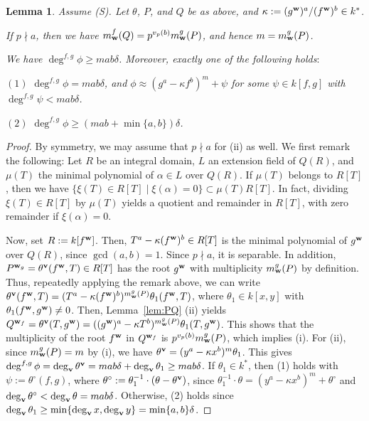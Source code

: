\documentclass{amsart}
\theoremstyle{plain}
\newtheorem{lem}[thm]{Lemma}
\theoremstyle{definition}
\newcommand{\nd}{\noindent}
\newcommand{\w}{{\bf w}}
\newcommand{\bv}{{\bf v}}
\newcommand{\degw  }{\deg}
\begin{document}
\begin{lem}\label{lem:lcm}
Assume {\rm (S)}. 
Let $\theta $, $P$, and $Q$ be as above, 
and $\kappa :=(g^{\w })^a/(f^{\w })^b\in k^*$. 


\nd{\rm (i)} 
If $p\nmid a$, then 
we have $m_{\w }^f(Q)=p^{v_p(b)}m_{\w }^g(P)$, 
and hence $m=m_{\w }^g(P)$. 


\nd{\rm (ii)} 
We have 
$\deg ^{f,g}\phi \ge mab\delta $. 
Moreover, 
exactly one of the following holds$:$ 



\nd 
$(1)$ 
$\deg ^{f,g}\phi =mab\delta $, 
and 
$\phi \approx (g^a-\kappa f^b)^m+\psi $ 
for some $\psi \in k[f,g]$ with $\deg ^{f,g}\psi <mab\delta $. 


\nd 
$(2)$ 
$\degw ^{f,g}\phi \ge (mab+\min \{ a,b\} )\delta $. 



\end{lem}
\begin{proof}
By symmetry, 
we may assume that $p\nmid a$ for (ii) as well. 
We first remark the following: 
Let $R$ be an integral domain, 
$L$ an extension field of $Q(R)$, 
and $\mu (T)$ the minimal polynomial of $\alpha \in L$ over $Q(R)$. 
If $\mu (T)$ belongs to $R[T]$, 
then we have 
$\{ \xi (T)\in R[T]\mid \xi (\alpha )=0\} \subset \mu (T)R[T]$. 
In fact, 
dividing $\xi (T)\in R[T]$ by $\mu (T)$ 
yields a quotient and remainder in $R[T]$, 
with zero remainder if $\xi (\alpha )=0$. 


Now, 
set $R:=k[f^{\w }]$. 
Then, $T^a-\kappa (f^{\w })^b\in R[T]$ is 
the minimal polynomial of $g^{\w }$ over $Q(R)$, 
since $\gcd (a,b)=1$. 
Since $p\nmid a$, it is separable. 
In addition, 
$P^{\w _g}=\theta ^{\bv }(f^{\w },T)\in R[T]$ 
has the root $g^{\w }$ with multiplicity $m_{\w }^g(P)$ 
by definition. 
Thus, repeatedly applying the remark above, we can write 
$\theta ^{\bv }(f^{\w },T)
=(T^a-\kappa (f^{\w })^b)^{m_{\w }^g(P)}\theta_1(f^{\w },T)$, 
where $\theta _1\in k[x,y]$ with $\theta _1(f^{\w },g^{\w })\ne 0$. 
Then, Lemma~\ref{lem:PQ} (ii) yields 
$Q^{\w _f}=\theta ^{\bv }(T,g^{\w })
=((g^{\w })^a-\kappa T^b)^{m_{\w }^g(P)}\theta _1(T,g^{\w })$. 
This shows that the multiplicity of the root 
$f^{\w }$ in $Q^{\w _f}$ is $p^{v_p(b)}m_{\w }^g(P)$, 
which implies (i). 
For (ii), 
since $m_{\w }^g(P)=m$ by (i), 
we have 
$\theta ^{\bv }=(y^a-\kappa x^b)^m\theta _1$. 
This gives 
$\degw ^{f,g}\phi 
=\deg _{\bv }\theta ^{\bv }
=mab\delta +\deg _{\bv }\theta _1\ge mab\delta $. 
If $\theta _1\in k^*$, 
then (1) holds with $\psi :=\theta ^\circ (f,g)$, 
where $\theta ^\circ :=\theta _1^{-1}\cdot (\theta -\theta ^{\bv })$, 
since 
$\theta _1^{-1}\cdot \theta =(y^a-\kappa x^b)^m+\theta ^\circ $ 
and $\deg _{\bv }\theta ^\circ <\deg _{\bv }\theta =mab\delta $. 
Otherwise, (2) holds since 
$\deg _{\bv }\theta _1\ge 
\min \{ \deg _{\bv }x,\deg _{\bv }y\} =\min \{ a,b\} \delta $. 
\end{proof}
\end{document}
